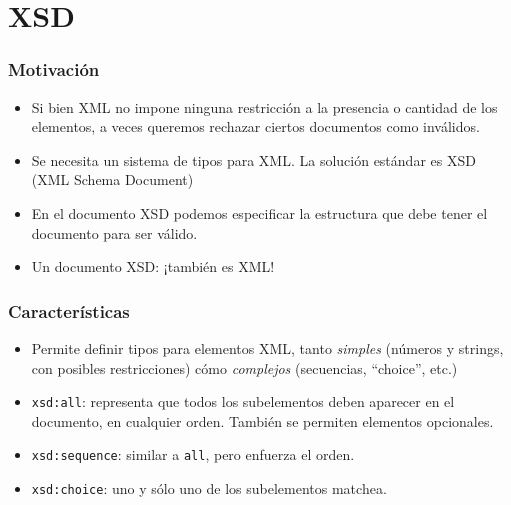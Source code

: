 \section{XSD}

\begin{frame}
\frametitle{Motivación}
\begin{itemize}
\item	Si bien XML no impone ninguna restricción a la presencia o cantidad
	de los elementos, a veces queremos rechazar ciertos documentos
	como inválidos.
	\pause

\item	Se necesita un sistema de tipos para XML. La solución
	estándar es XSD (XML Schema Document)
	\pause

\item	En el documento XSD podemos especificar la estructura que
	debe tener el documento para ser válido.
	\pause

\item	Un documento XSD: ¡también es XML!
\end{itemize}
\end{frame}

\begin{frame}
\frametitle{Características}
\begin{itemize}
\item	Permite definir tipos para elementos XML, tanto {\it simples}
	(números y strings, con posibles restricciones) cómo
	{\it complejos} (secuencias, ``choice'', etc.)
	\pause

\item	\texttt{xsd:all}: representa que todos los subelementos
	deben aparecer en el documento, en cualquier orden. También
	se permiten elementos opcionales.
	\pause

\item	\texttt{xsd:sequence}: similar a \texttt{all}, pero enfuerza
	el orden.
	\pause

\item	\texttt{xsd:choice}: uno y sólo uno de los subelementos
	matchea.
\end{itemize}
\end{frame}

